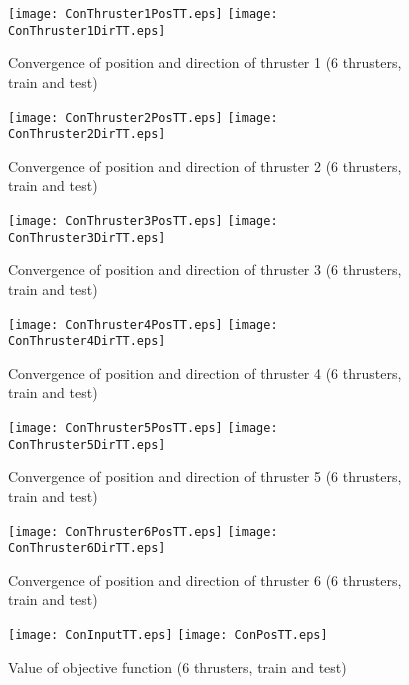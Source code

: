 \begin{figure}
\centering
\texttt{[image: ConThruster1PosTT.eps]}
\texttt{[image: ConThruster1DirTT.eps]}
\caption{Convergence of position and direction of thruster 1 (6 thrusters, train and test)}	
\label{FIG:ConThruster1TT}
\end{figure}
\begin{figure}
\centering
\texttt{[image: ConThruster2PosTT.eps]}
\texttt{[image: ConThruster2DirTT.eps]}
\caption{Convergence of position and direction of thruster 2 (6 thrusters, train and test)}	
\label{FIG:ConThruster2TT}
\end{figure}
\begin{figure}
\centering
\texttt{[image: ConThruster3PosTT.eps]}
\texttt{[image: ConThruster3DirTT.eps]}
\caption{Convergence of position and direction of thruster 3 (6 thrusters, train and test)}	
\label{FIG:ConThruster3TT}
\end{figure}
\begin{figure}
\centering
\texttt{[image: ConThruster4PosTT.eps]}
\texttt{[image: ConThruster4DirTT.eps]}
\caption{Convergence of position and direction of thruster 4 (6 thrusters, train and test)}	
\label{FIG:ConThruster4TT}
\end{figure}
\begin{figure}
\centering
\texttt{[image: ConThruster5PosTT.eps]}
\texttt{[image: ConThruster5DirTT.eps]}
\caption{Convergence of position and direction of thruster 5 (6 thrusters, train and test)}	
\label{FIG:ConThruster5TT}
\end{figure}
\begin{figure}
\centering
\texttt{[image: ConThruster6PosTT.eps]}
\texttt{[image: ConThruster6DirTT.eps]}
\caption{Convergence of position and direction of thruster 6 (6 thrusters, train and test)}	
\label{FIG:ConThruster6TT}
\end{figure}

\begin{figure}
\center
\texttt{[image: ConInputTT.eps]}
\texttt{[image: ConPosTT.eps]}
\caption{Value of objective function (6 thrusters, train and test)}	
\label{FIG:ConInputPosTT}
\end{figure}

